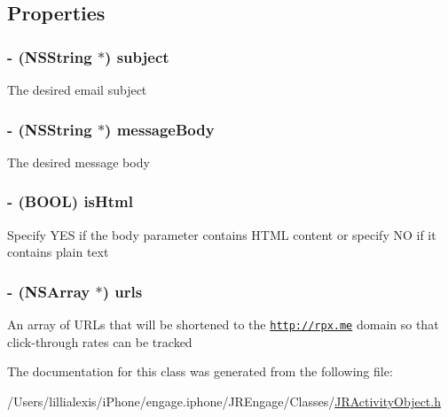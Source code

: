 \subsection{Properties}
\hypertarget{interface_j_r_email_object_a618a23c34ede4a4eb56ed6cf05d91b64}{
\subsubsection[{subject}]{\setlength{\rightskip}{0pt plus 5cm}-\/ (NSString $\ast$) subject}}
\label{interface_j_r_email_object_a618a23c34ede4a4eb56ed6cf05d91b64}
The desired email subject \hypertarget{interface_j_r_email_object_ad0e6a07cb2aec3cf6eee75d2ace32e7d}{
\subsubsection[{messageBody}]{\setlength{\rightskip}{0pt plus 5cm}-\/ (NSString $\ast$) messageBody}}
\label{interface_j_r_email_object_ad0e6a07cb2aec3cf6eee75d2ace32e7d}
The desired message body \hypertarget{interface_j_r_email_object_af372942f67fba5e93fb2b53f4ee8a3c5}{
\subsubsection[{isHtml}]{\setlength{\rightskip}{0pt plus 5cm}-\/ (BOOL) isHtml}}
\label{interface_j_r_email_object_af372942f67fba5e93fb2b53f4ee8a3c5}
Specify YES if the body parameter contains HTML content or specify NO if it contains plain text \hypertarget{interface_j_r_email_object_a3f274a24ce4145b46cb5f0cda50378ce}{
\subsubsection[{urls}]{\setlength{\rightskip}{0pt plus 5cm}-\/ (NSArray $\ast$) urls}}
\label{interface_j_r_email_object_a3f274a24ce4145b46cb5f0cda50378ce}
An array of URLs that will be shortened to the \href{http://rpx.me}{\tt http://rpx.me} domain so that click-\/through rates can be tracked \label{interface_j_r_email_object_emailUrls}
\hypertarget{interface_j_r_email_object_emailUrls}{}
 

The documentation for this class was generated from the following file:\begin{DoxyCompactItemize}
\item 
/Users/lillialexis/iPhone/engage.iphone/JREngage/Classes/\hyperlink{_j_r_activity_object_8h}{JRActivityObject.h}\end{DoxyCompactItemize}
